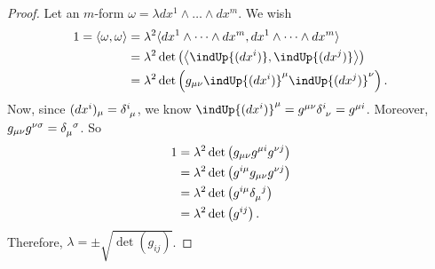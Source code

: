 \documentclass[../main.tex]{subfiles}
\begin{document}
    \begin{proof}
        Let an \(m\)-form \(\omega=\lambda dx^1\wedge\dots\wedge dx^m\). We wish 
        \[
        \begin{aligned}
            1 = \langle\omega, \omega\rangle
            &= \lambda^2\langle dx^1\wedge\dots\wedge dx^m, 
            dx^1\wedge\dots\wedge dx^m\rangle\\
            &= \lambda^2 \det \left(\left<\indUp{(dx^i)}, \indUp{(dx^j)}\right>\right)\\
            &= \lambda^2 \det \left(g_{\mu\nu}{\indUp{(dx^i)}}^\mu{\indUp{(dx^j)}}^\nu\right).
        \end{aligned}
        \]
        Now, since \((dx^i)_\mu=\delta\indices{^i_\mu}\), we know 
        \({\indUp{(dx^i)}}^\mu=g^{\mu\nu}\delta\indices{^i_\nu}=g^{\mu i}\). Moreover, 
        \(g_{\mu\nu}g^{\nu\sigma}=\delta\indices{_\mu^\sigma}\). So 
        \[
        \begin{aligned}
            1 &= \lambda^2 \det \left(g_{\mu\nu}g^{\mu i}g^{\nu j}\right)\\
            &= \lambda^2 \det \left(g^{i\mu}g_{\mu\nu}g^{\nu j}\right)\\
            &= \lambda^2 \det \left(g^{i\mu}\delta\indices{_\mu^j}\right)\\
            &= \lambda^2 \det \left(g^{ij}\right).
        \end{aligned}
        \]
        Therefore, \(\lambda=\pm\sqrt{\det \left(g_{ij}\right)}\).
    \end{proof}
    \newpage
\end{document}
